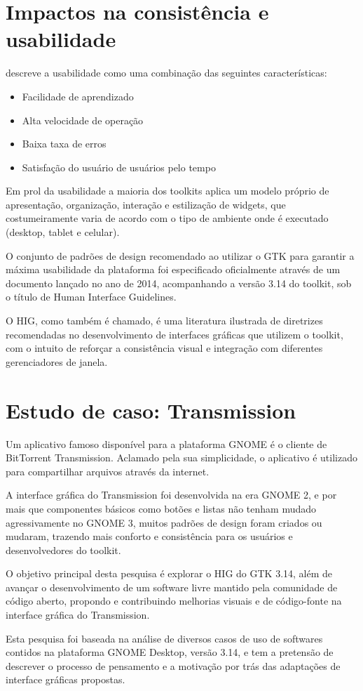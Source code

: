 \section{Impactos na consistência e usabilidade}

 descreve a usabilidade como uma combinação
das seguintes características:

\begin{itemize}
    \item Facilidade de aprendizado
    \item Alta velocidade de operação
    \item Baixa taxa de erros
    \item Satisfação do usuário
     de usuários pelo tempo
\end{itemize}

Em prol da usabilidade a maioria dos toolkits aplica um modelo próprio de
apresentação, organização, interação e estilização de widgets, que
costumeiramente varia de acordo com o tipo de ambiente onde é executado
(desktop, tablet e celular).

O conjunto de padrões de design recomendado ao utilizar o GTK para garantir a
máxima usabilidade da plataforma foi especificado oficialmente através de um
documento lançado no ano de 2014, acompanhando a versão 3.14 do toolkit, sob o
título de Human Interface Guidelines.

O HIG, como também é chamado, é uma literatura ilustrada de diretrizes
recomendadas no desenvolvimento de interfaces gráficas que utilizem o toolkit,
com o intuito de reforçar a consistência visual e integração com diferentes
gerenciadores de janela.

\section{Estudo de caso: Transmission}

Um aplicativo famoso disponível para a plataforma GNOME é o cliente de
BitTorrent Transmission. Aclamado pela sua simplicidade, o aplicativo é
utilizado para compartilhar arquivos através da internet.

A interface gráfica do Transmission foi desenvolvida na era GNOME 2, e por mais
que componentes básicos como botões e listas não tenham mudado agressivamente no
GNOME 3, muitos padrões de design foram criados ou mudaram, trazendo mais
conforto e consistência para os usuários e desenvolvedores do toolkit.

O objetivo principal desta pesquisa é explorar o HIG do GTK 3.14, além de
avançar o desenvolvimento de um software livre mantido pela comunidade de código
aberto, propondo e contribuindo melhorias visuais e de código-fonte na interface
gráfica do Transmission.

Esta pesquisa foi baseada na análise de diversos casos de uso de softwares
contidos na plataforma GNOME Desktop, versão 3.14, e tem a pretensão de
descrever o processo de pensamento e a motivação por trás das adaptações de
interface gráficas propostas.
